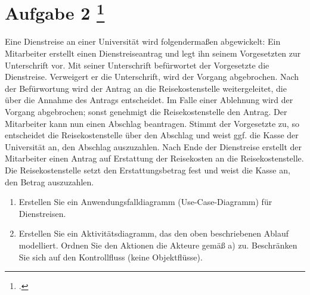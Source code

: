 \documentclass{lehramt-informatik-aufgabe}
\begin{document}
\section{Aufgabe 2
\footcite{examen:66116:2019:09}}

Eine Dienstreise an einer Universität wird folgendermaßen abgewickelt:
Ein Mitarbeiter erstellt einen Dienstreiseantrag und legt ihn seinem
Vorgesetzten zur Unterschrift vor. Mit seiner Unterschrift befürwortet
der Vorgesetzte die Dienstreise. Verweigert er die Unterschrift, wird
der Vorgang abgebrochen. Nach der Befürwortung wird der Antrag an die
Reisekostenstelle weitergeleitet, die über die Annahme des Antrags
entscheidet. Im Falle einer Ablehnung wird der Vorgang abgebrochen;
sonst genehmigt die Reisekostenstelle den Antrag. Der Mitarbeiter kann
nun einen Abschlag beantragen. Stimmt der Vorgesetzte zu, so entscheidet
die Reisekostenstelle über den Abschlag und weist ggf. die Kasse der
Universität an, den Abschlag auszuzahlen. Nach Ende der Dienstreise
erstellt der Mitarbeiter einen Antrag auf Erstattung der Reisekosten an
die Reisekostenstelle. Die Reisekostenstelle setzt den Erstattungsbetrag
fest und weist die Kasse an, den Betrag auszuzahlen.

\begin{enumerate}

\item Erstellen Sie ein Anwendungsfalldiagramm (Use-Case-Diagramm) für
Dienstreisen.


\item Erstellen Sie ein Aktivitätsdiagramm, das den oben beschriebenen
Ablauf modelliert. Ordnen Sie den Aktionen die Akteure gemäß a) zu.
Beschränken Sie sich auf den Kontrollfluss (keine Objektflüsse).
\end{enumerate}
\end{document}
